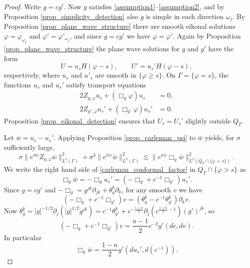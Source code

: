 \documentclass[11pt,letterpaper]{amsart}
\theoremstyle{definition}
\numberwithin{equation}{section}
\newcommand{\norm}[1]{\lVert #1 \rVert}         %
\newcommand{\p}{\partial}
\def\p{\partial}
\begin{document}
\begin{proof}
Write $g = c g'$. Now $g$ satisfies \eqref{assumption1}--\eqref{assumption2}, and by Proposition \ref{prop_simplicity_detection} also $g$ is simple in each direction $\omega_j$. By Proposition \ref{prop_plane_wave_structure} there are smooth eikonal solutions $\varphi = \varphi_{\omega_j}$ and $\varphi' = \varphi'_{\omega_j}$, and since $g = c g'$ we have $\varphi = \varphi'$. Again by Proposition \ref{prop_plane_wave_structure} the plane wave solutions for $g$ and $g'$ have the form 
\[
U = u_s H(\varphi-s), \qquad U' = u_s' H(\varphi-s),
\]
respectively, where $u_s$ and $u'_s$ are smooth in $\{ \varphi \geq s \}$. On $\Gamma = \{ \varphi = s \}$, the functions $u_s$ and $u_s'$ satisfy transport equations 
\begin{align*}
2 Z_{g,\varphi} u_s + (\Box_g \varphi) u_s &= 0, \\
2 Z_{g',\varphi} u_s' + (\Box_{g'} \varphi) u_s' &= 0.
\end{align*}
Proposition \ref{prop_eikonal_detection} ensures that $U_s = U_s'$ slightly outside $Q_T$.

Let $\bar{w} = u_s - u_s'$. Applying Proposition \ref{prop_carleman_psi} to $\bar{w}$ yields, for $\sigma$ sufficiently large,  
\begin{equation} \label{carleman_conformal_factor}
\sigma \norm{e^{\sigma \psi} Z_{g,\varphi} \bar{w}}_{L^2(\Gamma)}^2 + \sigma^3 \norm{e^{\sigma \psi} \bar{w}}_{L^2(\Gamma)}^2 \lesssim \norm{e^{\sigma \psi} \Box_g \bar{w}}_{L^2(Q_T \cap \{ \varphi > s \})}^2.
\end{equation}
We write the right hand side of \eqref{carleman_conformal_factor} in $Q_T \cap \{ \varphi > s \}$ as 
\[
\Box_g \bar{w} = -\Box_g u_s' = (-\Box_g + c^{-1} \Box_{g'}) u_s'.
\]
Since $g = c g'$ and $-\Box_g = g^{jk} \p_{jk} + \theta_g^k \p_k$, for any smooth $v$ we have 
\[
(-\Box_g + c^{-1} \Box_{g'}) v = (\theta_g^k - c^{-1} \theta_{g'}^k) \p_k v.
\]
Now $\theta_g^k = |g|^{-1/2} \p_j(|g|^{1/2} g^{jk}) = c^{-1} \theta_{g'}^k + c^{-\frac{1+n}{2}} \p_j(c^{\frac{1+n}{2}-1}) (g')^{jk}$, so 
\begin{equation} \label{boxg_cinvboxgprime}
(-\Box_g + c^{-1} \Box_{g'}) v  = \frac{n-1}{2} c^{-2} g'(dc, dv).
\end{equation}
In particular 
\[
\Box_g \bar{w} = \frac{1-n}{2} g'(du_s', d(c^{-1})).
\]


\end{proof}
\end{document}

